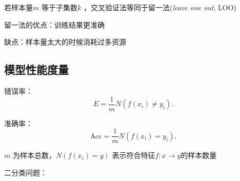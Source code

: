 \begin{notation}
    若样本量$m$ 等于子集数$k$ ，交叉验证法等同于留一法(\textit{leave one out}, LOO)

    留一法的优点：训练结果更准确

    缺点：样本量太大的时候消耗过多资源
\end{notation}
\subsection{模型性能度量}%
\label{sub:模型性能度量}
\begin{notation}
    错误率：\[
        E=\frac{1}{m} N\left( f\left( x_{i} \right) \neq y_{i} \right) 
    .\] 

    准确率：\[
        \text{Acc}=\frac{1}{m} N\left( f\left( x_{i} \right) =y_{i} \right) 
    .\] 

    $m$ 为样本总数，$N\left( f\left( x_{i} \right) =y \right) $ 表示符合特征$f:x\to y$的样本数量
\end{notation}
\begin{notation}
    二分类问题：
\end{notation}








